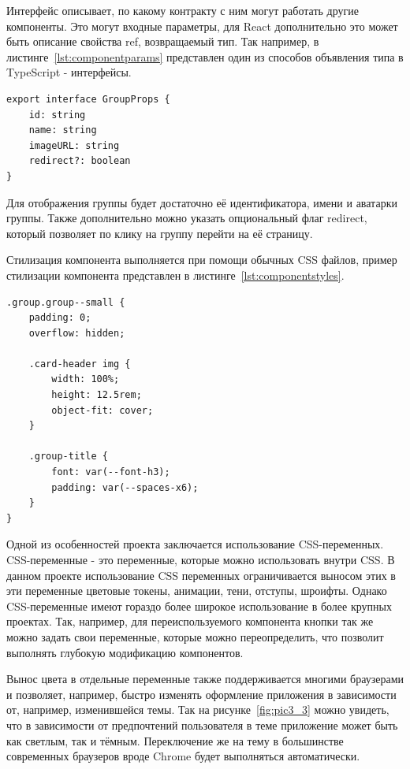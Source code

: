 \documentclass[14pt]{extarticle}
\begin{document}
Интерфейс описывает, по какому контракту с ним могут работать другие компоненты. Это могут входные параметры, для React дополнительно 
это может быть описание свойства ref, возвращаемый тип. Так например, в листинге~\ref{lst:componentparams} представлен один из способов объявления типа в 
TypeScript - интерфейсы. 

\begin{lstlisting}[caption={Интерфейс компонента группы}, label={lst:componentparams}]
export interface GroupProps {
    id: string
    name: string
    imageURL: string
    redirect?: boolean
}
\end{lstlisting}

Для отображения группы будет достаточно её идентификатора, имени и аватарки группы. Также дополнительно можно указать опциональный флаг redirect, который
позволяет по клику на группу перейти на её страницу.

Стилизация компонента выполняется при помощи обычных CSS файлов, пример стилизации компонента представлен в листинге~\ref{lst:componentstyles}. 

\begin{lstlisting}[caption={Стилизация компонента группы}, label={lst:componentstyles}]
.group.group--small {
    padding: 0;
    overflow: hidden;

    .card-header img {
        width: 100%;
        height: 12.5rem;
        object-fit: cover;
    }

    .group-title {
        font: var(--font-h3);
        padding: var(--spaces-x6);
    }
}
\end{lstlisting}

Одной из особенностей проекта заключается использование CSS-переменных. CSS-переменные - это переменные, которые можно использовать внутри CSS. В данном
проекте использование CSS переменных ограничивается выносом этих в эти переменные цветовые токены, анимации, тени, отступы, шроифты. Однако
CSS-переменные имеют гораздо более широкое использование в более крупных проектах. Так, например, для переиспользуемого компонента кнопки так же можно задать
свои переменные, которые можно переопределить, что позволит выполнять глубокую модификацию компонентов.

Вынос цвета в отдельные переменные также поддерживается многими браузерами и позволяет, например, быстро изменять оформление приложения в зависимости от, например, 
изменившейся темы. Так на рисунке~\ref{fig:pic3_3} можно увидеть, что в зависимости от предпочтений пользователя в теме приложение может быть как светлым, так и 
тёмным. Переключение же на тему в большинстве современных браузеров вроде Chrome будет выполняться автоматически.
\end{document}
